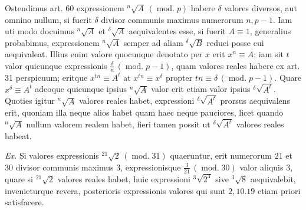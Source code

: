 Ostendimus art. 60 expressionem ${}^{n}\!\surd {A}\,(\operatorname{mod.}p)$ habere $\delta$ valores diversos, aut omnino nullum, si fuerit $\delta$ divisor communis maximus numerorum $n,p-1$. Iam uti modo docuimus ${}^{n}\!\surd {A}$ et ${}^{\delta}\!\surd {A}$ aequivalentes esse, si fuerit $A\equiv1$, generalius probabimus, expressionem ${}^{n}\!\surd {A}$ semper ad aliam ${}^{\delta}\!\surd {B}$ reduci posse cui aequivaleat. Illius enim valore quocunque denotato per $x$ erit $x^n\equiv A$; iam
sit $t$ valor quicunque expressionis $\frac{\delta}{n}\,(\operatorname{mod.}p-1)$, quam valores reales habere ex art. 31 perspicuum; eritque $x^{tn}\equiv A^t$ at $x^{tn}\equiv x^\delta$ propter $tn\equiv\delta\,(\operatorname{mod.}p-1)$. Quare $x^\delta\equiv A^t$ adeoque quicunque ipsius ${}^{n}\!\surd {A}$ valor erit etiam valor ipsius ${}^{\delta}\!\surd {A^t}$. Quoties igitur ${}^{n}\!\surd {A}$ valores reales habet, expressioni ${}^{\delta}\!\surd {A^t}$ prorsus aequivalens erit, quoniam illa neque alios habet quam haec neque pauciores, licet quando ${}^{n}\!\surd {A}$ nullum valorem realem habet, fieri tamen possit ut ${}^{\delta}\!\surd {A^t}$ valores reales habeat.

\emph{Ex.} Si valores expressionis ${}^{21}\!\surd {2}\,(\operatorname{mod.}31)$ quaeruntur, erit numerorum $21$ et $30$ divisor communis maximus $3$, expressionisque $\frac{3}{21}\,(\operatorname{mod.}30)$ valor aliquis $3$, quare si ${}^{21}\!\surd {2}$ valores reales habet, huic expressioni ${}^{3}\!\surd {2^3}$ sive ${}^{3}\!\surd {8}$ aequivalebit, invenieturque revera, posterioris expressionis valores qui sunt $2,10.19$ etiam priori satisfacere.



